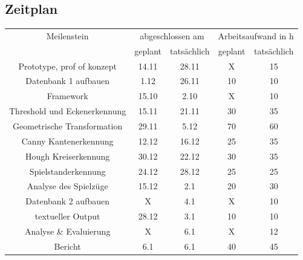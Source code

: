 \documentclass[paper=A4, deutsch]{scrartcl}
\begin{document}
\subsection{Zeitplan}

\begin{table}[h!]
	\centering
	\begin{tabular}{|c|c|c|c|c|}
		\hline
		Meilenstein & \multicolumn{2}{c|}{abgeschlossen am} & \multicolumn{2}{c|}{Arbeitsaufwand in h}\\
		\cline{2-5}
		 & geplant & tatsächlich & geplant & tatsächlich\\
		\hline
				Prototype, prof of konzept & 14.11 & 28.11 & X & 15\\
		\hline
				Datenbank 1 aufbauen & 1.12 & 26.11 & 10 & 10\\
		\hline
				Framework &15.10 &2.10 & X & 10\\
		\hline	
				Threshold und Eckenerkennung & 15.11 & 21.11 & 30 &35\\
		\hline	
				Geometrische Transformation & 29.11 & 5.12 & 70 &60\\
		\hline	
				Canny Kantenerkennung & 12.12 & 16.12 & 25 & 35\\
		\hline	
				Hough Kreiserkennung & 30.12 & 22.12 & 30 & 35\\
		\hline	
				Spielstanderkennung & 24.12 & 28.12 & 25 & 25\\
		\hline	
				Analyse des Spielzüge & 15.12 & 2.1 &20 &30\\
		\hline	
				Datenbank 2 aufbauen & X & 4.1 & X & 10\\
		\hline
				textueller Output & 28.12 &  3.1 & 10 & 10 \\
		\hline 
				Analyse \& Evaluierung & X & 6.1 & X & 12\\
		\hline
				Bericht & 6.1 & 6.1 & 40 & 45\\
		\hline
	\end{tabular}
\end{table}

\end{document}
